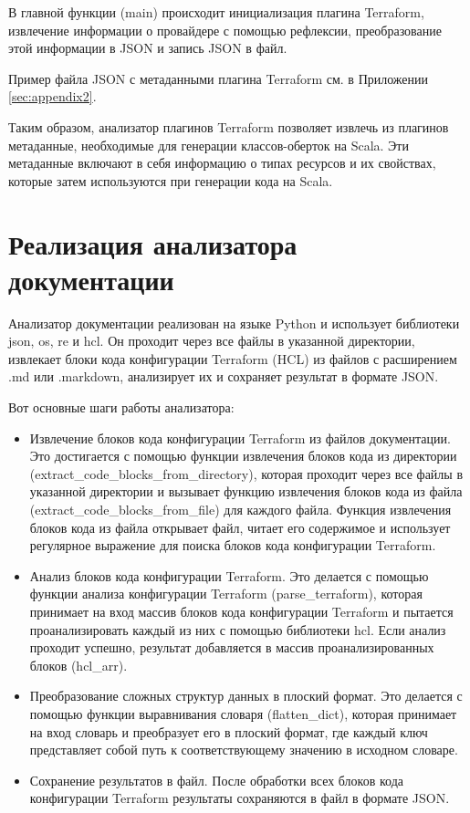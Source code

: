 В главной функции (main) происходит инициализация плагина Terraform, извлечение
информации о провайдере с помощью рефлексии, преобразование этой информации в
JSON и запись JSON в файл.

Пример файла JSON с метаданными плагина Terraform см. в Приложении
\ref{sec:appendix2}.

Таким образом, анализатор плагинов Terraform позволяет извлечь из плагинов
метаданные, необходимые для генерации классов-оберток на Scala. Эти метаданные
включают в себя информацию о типах ресурсов и их свойствах, которые затем
используются при генерации кода на Scala.

\section{Реализация анализатора документации}

Анализатор документации реализован на языке Python и использует библиотеки json,
os, re и hcl. Он проходит через все файлы в указанной директории, извлекает
блоки кода конфигурации Terraform (HCL) из файлов с расширением .md или
.markdown, анализирует их и сохраняет результат в формате JSON.

Вот основные шаги работы анализатора:

\begin{itemize}
  \item Извлечение блоков кода конфигурации Terraform из файлов документации.
Это достигается с помощью функции извлечения блоков кода из директории
(extract\_code\_blocks\_from\_directory), которая проходит через все файлы в
указанной директории и вызывает функцию извлечения блоков кода из файла
(extract\_code\_blocks\_from\_file) для каждого файла. Функция извлечения блоков
кода из файла открывает файл, читает его содержимое и использует регулярное
выражение для поиска блоков кода конфигурации Terraform.
  
  \item Анализ блоков кода конфигурации Terraform. Это делается с помощью
функции анализа конфигурации Terraform (parse\_terraform), которая принимает на
вход массив блоков кода конфигурации Terraform и пытается проанализировать
каждый из них с помощью библиотеки hcl. Если анализ проходит успешно, результат
добавляется в массив проанализированных блоков (hcl\_arr).
  
  \item Преобразование сложных структур данных в плоский формат. Это делается с
помощью функции выравнивания словаря (flatten\_dict), которая принимает на вход
словарь и преобразует его в плоский формат, где каждый ключ представляет собой
путь к соответствующему значению в исходном словаре.
  
  \item Сохранение результатов в файл. После обработки всех блоков кода
конфигурации Terraform результаты сохраняются в файл в формате JSON.
\end{itemize}

